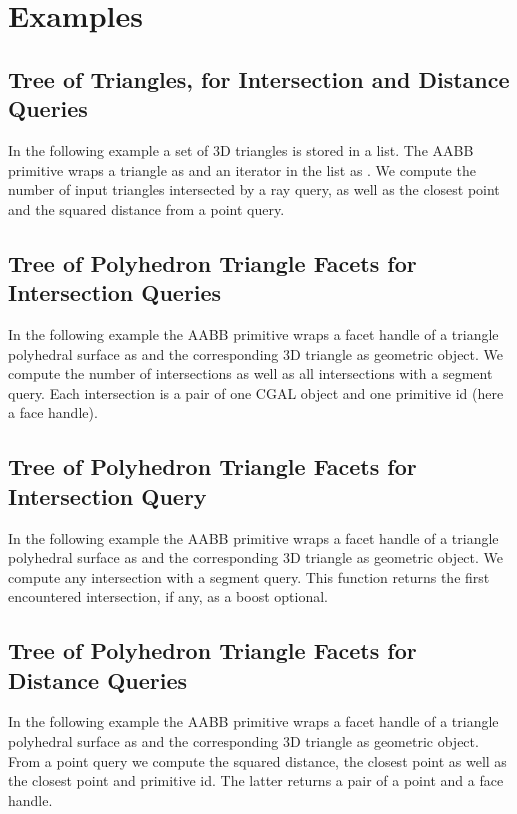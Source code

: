 \section{Examples}
\label{AABB_tree_section_examples}

\subsection{Tree of Triangles, for Intersection and Distance Queries}
In the following example a set of 3D triangles is stored in a list. The AABB primitive wraps a triangle as  and an iterator in the list as . We compute the number of input triangles intersected by a ray query, as well as the closest point and the squared distance from a point query.


\subsection{Tree of Polyhedron Triangle Facets for Intersection Queries}
In the following example the AABB primitive wraps a facet handle of a triangle polyhedral surface as  and the corresponding 3D triangle as geometric object. We compute the number of intersections as well as all intersections with a segment query. Each intersection is a pair of one CGAL object and one primitive id (here a face handle).

\subsection{Tree of Polyhedron Triangle Facets for Intersection Query}
In the following example the AABB primitive wraps a facet handle of a triangle polyhedral surface as  and the corresponding 3D triangle as geometric object. We compute any intersection with a segment query. This function returns the first encountered intersection, if any, as a boost optional.

\subsection{Tree of Polyhedron Triangle Facets for Distance Queries}
In the following example the AABB primitive wraps a facet handle of a triangle polyhedral surface as  and the corresponding 3D triangle as geometric object. From a point query we compute the squared distance, the closest point as well as the closest point and primitive id. The latter returns a pair of a point and a face handle. 

